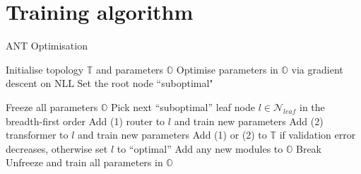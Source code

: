 \section{Training algorithm}\label{sec:supp_algorithm}
\begin{algorithm}
	\caption{ANT Optimisation}
	\label{alg:growth}
	\scriptsize
	\begin{algorithmic}
		\State Initialise topology $\mathbb{T}$ and parameters $\mathbb{O}$
		\State Optimise parameters in $\mathbb{O}$ via gradient descent on NLL 
		\State Set the root node ``suboptimal"
		
		 
		\State Freeze all parameters $\mathbb{O}$
		\State Pick next ``suboptimal'' leaf node $l\in\mathcal{N}_{leaf}$ in the breadth-first order
		\State Add (1) router to $l$ and train new parameters 
		\State Add (2) transformer to $l$ and train new parameters
		\State Add (1) or (2) to $\mathbb{T}$ if validation error decreases, otherwise set $l$ to ``optimal''
		\State Add any new modules to $\mathbb{O}$ 
		\State Break
		\EndIf
		\EndWhile
		\State Unfreeze and train all parameters in $\mathbb{O}$
	\end{algorithmic}
\end{algorithm}


\vspace{-2mm}
